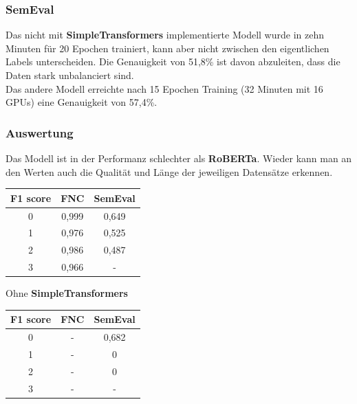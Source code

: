 \subsubsection*{SemEval}
Das nicht mit \textbf{SimpleTransformers} implementierte Modell wurde in zehn Minuten f\"ur 20 Epochen trainiert, kann aber nicht zwischen den eigentlichen Labels unterscheiden. Die Genauigkeit von 51,8\% ist davon abzuleiten, dass die Daten stark unbalanciert sind.\\
Das andere Modell erreichte nach 15 Epochen Training (32 Minuten mit 16 GPUs) eine Genauigkeit von 57,4\%.

\subsubsection*{Auswertung}
Das Modell ist in der Performanz schlechter als \textbf{RoBERTa}. Wieder kann man an den Werten auch die Qualit\"at und L\"ange der jeweiligen Datens\"atze erkennen.
\begin{center}
\begin{tabular}{|c||c|c|}
\hline
F1 score & FNC & SemEval\\ 
\hline\hline
0 & 0,999 & 0,649\\
\hline
1 & 0,976 & 0,525\\ 
\hline
2 & 0,986 & 0,487\\
\hline
3 & 0,966 & -\\
\hline    
\end{tabular}
\end{center}
Ohne \textbf{SimpleTransformers}
\begin{center}
\begin{tabular}{|c||c|c|}
\hline
F1 score & FNC & SemEval\\ 
\hline\hline
0 & - & 0,682\\
\hline
1 & - & 0\\ 
\hline
2 & - & 0\\
\hline
3 & - & -\\
\hline    
\end{tabular}
\end{center}

